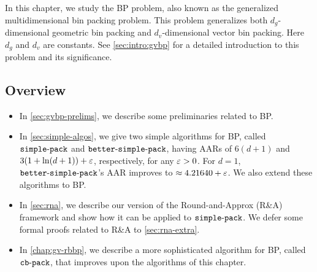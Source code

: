 In this chapter, we study the  BP problem,
also known as the generalized multidimensional bin packing problem.
This problem generalizes both $d_g$-dimensional geometric bin packing
and $d_v$-dimensional vector bin packing.
Here $d_g$ and $d_v$ are constants.
See \cref{sec:intro:gvbp} for a detailed introduction to this problem and its significance.

\subsection*{Overview}

\begin{itemize}
\item In \cref{sec:gvbp-prelims}, we describe some preliminaries related
    to  BP.
\item In \cref{sec:simple-algos}, we give two simple algorithms for  BP,
    called $\operatorname{\mathtt{simple-pack}}$ and $\operatorname{\mathtt{better-simple-pack}}$, having AARs of
    $6(d+1)$ and $3(1+\ln(d+1))+\varepsilon$, respectively, for any $\varepsilon > 0$.
    For $d = 1$, $\operatorname{\mathtt{better-simple-pack}}$'s AAR improves to $\approx 4.21640 + \varepsilon$.
    We also extend these algorithms to  BP.
\item In \cref{sec:rna}, we describe our version of the Round-and-Approx (R\&A) framework
    and show how it can be applied to $\operatorname{\mathtt{simple-pack}}$.
    We defer some formal proofs related to R\&A to \cref{sec:rna-extra}.
\item In \cref{chap:gv-rbbp}, we describe a more sophisticated algorithm for  BP,
    called $\operatorname{\mathtt{cb-pack}}$, that improves upon the algorithms of this chapter.
\end{itemize}
